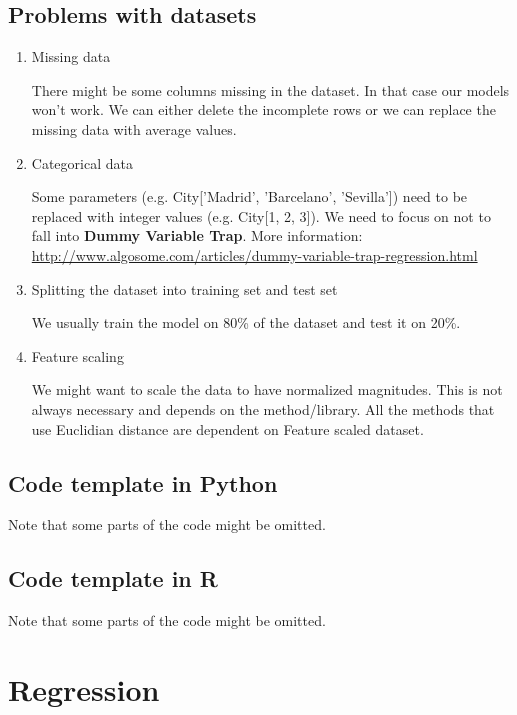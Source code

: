 \documentclass[runningheads,a4paper]{llncs}
\begin{document}
\subsection{Problems with datasets}
\begin{enumerate}
\item Missing data

There might be some columns missing in the dataset. In that case our models won't work. We can either delete the incomplete rows or we can replace the missing data with average values. 

\item Categorical data

Some parameters (e.g. City['Madrid', 'Barcelano', 'Sevilla']) need to be replaced with integer values (e.g. City[1, 2, 3]). We need to focus on not to fall into \textbf{Dummy Variable Trap}. More information: \url{http://www.algosome.com/articles/dummy-variable-trap-regression.html}

\item Splitting the dataset into training set and test set

We usually train the model on 80\% of the dataset and test it on 20\%.

\item Feature scaling

We might want to scale the data to have normalized magnitudes. This is not always necessary and depends on the method/library. All the methods that use Euclidian distance are dependent on Feature scaled dataset.
\end{enumerate}

\subsection{Code template in Python}
Note that some parts of the code might be omitted.

\lstset{basicstyle=\tiny,style=Python}


\subsection{Code template in R}
Note that some parts of the code might be omitted.

\lstset{basicstyle=\tiny,style=R}


\newpage

\section{Regression}
\end{document}
